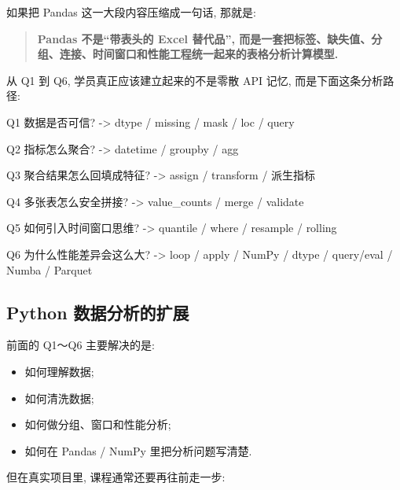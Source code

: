 \documentclass[11pt]{article}
\providecommand{\tightlist}{%
      \setlength{\itemsep}{0pt}\setlength{\parskip}{0pt}}
\newenvironment{Shaded}{}{}
\newcommand{\NormalTok}[1]{{#1}}
\begin{document}
    如果把 Pandas 这一大段内容压缩成一句话, 那就是:

\begin{quote}
\textbf{Pandas 不是``带表头的 Excel 替代品'',
而是一套把标签、缺失值、分组、连接、时间窗口和性能工程统一起来的表格分析计算模型.}
\end{quote}

从 Q1 到 Q6, 学员真正应该建立起来的不是零散 API 记忆,
而是下面这条分析路径:

\begin{Shaded}
\begin{Highlighting}[]
\NormalTok{Q1 数据是否可信? }
\NormalTok{    {-}\textgreater{} dtype / missing / mask / loc / query}

\NormalTok{Q2 指标怎么聚合? }
\NormalTok{    {-}\textgreater{} datetime / groupby / agg}

\NormalTok{Q3 聚合结果怎么回填成特征? }
\NormalTok{    {-}\textgreater{} assign / transform / 派生指标}

\NormalTok{Q4 多张表怎么安全拼接? }
\NormalTok{    {-}\textgreater{} value\_counts / merge / validate}

\NormalTok{Q5 如何引入时间窗口思维? }
\NormalTok{    {-}\textgreater{} quantile / where / resample / rolling}

\NormalTok{Q6 为什么性能差异会这么大? }
\NormalTok{    {-}\textgreater{} loop / apply / NumPy / dtype / query/eval / Numba / Parquet}
\end{Highlighting}
\end{Shaded}

    \subsection{Python
数据分析的扩展}\label{python-ux6570ux636eux5206ux6790ux7684ux6269ux5c55}

    前面的 Q1～Q6 主要解决的是:

\begin{itemize}
\tightlist
\item
  如何理解数据;\\
\item
  如何清洗数据;\\
\item
  如何做分组、窗口和性能分析;\\
\item
  如何在 Pandas / NumPy 里把分析问题写清楚.
\end{itemize}

但在真实项目里, 课程通常还要再往前走一步:
\end{document}
